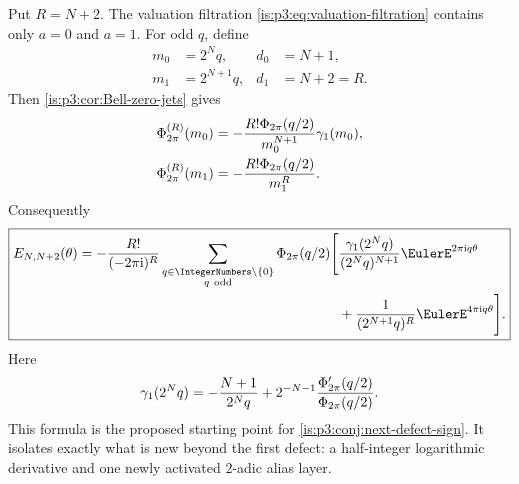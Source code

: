 Put $R=N+2$.  The valuation filtration \eqref{is:p3:eq:valuation-filtration} contains only $a=0$ and $a=1$.  For odd $q$, define
\begin{align}
 m_0&=2^Nq,&d_0&=N+1,\\
 m_1&=2^{N+1}q,&d_1&=N+2=R.
\end{align}
Then \cref{is:p3:cor:Bell-zero-jets} gives
\begin{align}
 \Phi_{2\pi}^{(R)}(m_0)
 &=-\frac{R!\Phi_{2\pi}(q/2)}{m_0^{N+1}}\gamma_1(m_0),
 \label{is:p3:eq:next-defect-layer0}\\
 \Phi_{2\pi}^{(R)}(m_1)
 &=-\frac{R!\Phi_{2\pi}(q/2)}{m_1^R}.
 \label{is:p3:eq:next-defect-layer1}
\end{align}
Consequently
\begin{equation}
\boxed{
\begin{aligned}
 E_{N,N+2}(\theta)
 =-\frac{R!}{(-2\pi\iu)^R}
 \sum_{\substack{q\in\IntegerNumbers\setminus\{0\}\\q\ \mathrm{odd}}}
 \PhiCyc(q/2)\Bigg[&
 \frac{\gamma_1(2^Nq)}{(2^Nq)^{N+1}}
 \EulerE^{2\pi\iu q\theta}\\
 &+\frac{1}{(2^{N+1}q)^R}
 \EulerE^{4\pi\iu q\theta}\Bigg].
\end{aligned}}
\label{is:p3:eq:next-defect-exact}
\end{equation}
Here
\begin{equation}
 \gamma_1(2^Nq)
 =-\frac{N+1}{2^Nq}
 +2^{-N-1}\frac{\Phi_{2\pi}'(q/2)}{\Phi_{2\pi}(q/2)}.
 \label{is:p3:eq:next-defect-gamma1}
\end{equation}
This formula is the proposed starting point for \cref{is:p3:conj:next-defect-sign}.  It isolates exactly what is new beyond the first defect: a half-integer logarithmic derivative and one newly activated $2$-adic alias layer.
